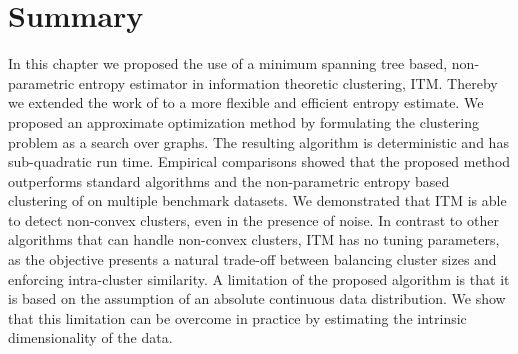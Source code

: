 \section{Summary}
In this chapter we proposed the use of a minimum spanning tree based,
non-parametric entropy estimator in information theoretic clustering, ITM\@.
Thereby we extended the work of \citet{faivishevsky2010nonparametric} to a more
flexible and efficient entropy estimate.  We proposed an approximate optimization
method by formulating the clustering problem as a search over graphs.
The resulting algorithm is deterministic and has sub-quadratic run time.
%
Empirical comparisons showed that the proposed method outperforms standard
algorithms and the non-parametric entropy based clustering of
\citep{faivishevsky2010nonparametric} on multiple benchmark datasets. We
demonstrated that ITM is able to detect non-convex clusters,
even in the presence of noise.
%
In contrast to other algorithms that can handle non-convex clusters, ITM has no
tuning parameters, as the objective presents a natural trade-off between
balancing cluster sizes and enforcing intra-cluster similarity.
%
A limitation of the proposed algorithm is that it is based on the assumption 
of an absolute continuous data distribution. We show that this limitation can
be overcome in practice by estimating the intrinsic dimensionality of the data. 
%
%
